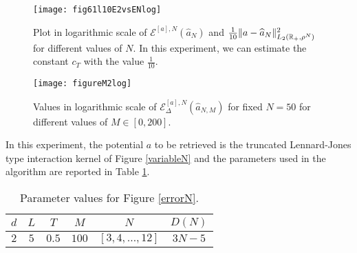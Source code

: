 \begin{figure}[h]
\hspace{-1.2cm}
\begin{minipage}{0.58\textwidth}
\begin{center}
\texttt{[image: fig61l10E2vsENlog]}
\end{center}
\label{fig:coerc}
\caption{Plot in logarithmic scale of $\mathcal{E}^{[a],N}(\widehat{a}_N)$ and $\frac{1}{10}\|a-\widehat{a}_N\|^2_{L_2(\mathbb{R}_+,\rho^N)}$ for different values of $N$. In this experiment, we can estimate the constant $c_T$ with the value $\frac{1}{10}$.}\label{errorN}
\end{minipage}
\hspace{0.4cm}
\begin{minipage}{0.55\textwidth}
\begin{center}
\texttt{[image: figureM2log]}
\end{center}
\label{fig:coerc2}
\caption{Values in logarithmic scale of $\mathcal{E}^{[a],N}_\Delta(\widehat a_{N,M})$ for fixed $N = 50$ for different values of $M \in [0,200]$.}\label{Mconstr}
\end{minipage}
\end{figure}

In this experiment, the potential $a$ to be retrieved is the truncated Lennard-Jones type interaction kernel of Figure \ref{variableN} and the parameters used in the algorithm are reported in Table \ref{tab:fig3}.

\begin{table}[h]
\begin{center}
\begin{tabular}{ |c|c|c|c|c|c| }
\hline
  $d$ & $L$ & $T$ & $M$ & $N$ & $D(N)$ \\
\hline
\hline
  $2$ & $5$ & $0.5$ & $100$ & $[3,4,\ldots,12]$ & $3N-5$ \\
\hline
\end{tabular}
\end{center}
\vspace{-0.5cm}
\caption{Parameter values for Figure \ref{errorN}.} \label{tab:fig3} 
\end{table}

